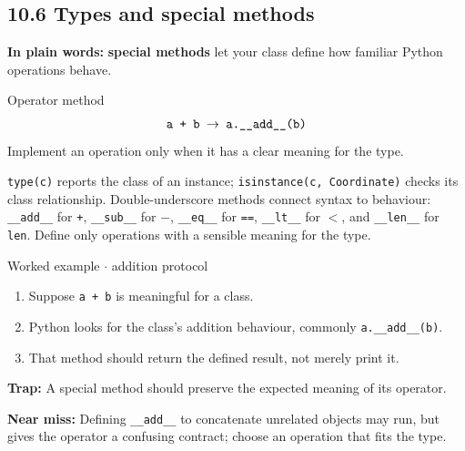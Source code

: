 \documentclass[11pt]{article}
\begin{document}
\begin{keepsection}
\section{10.6 Types and special methods}

\begin{plainbox}\textbf{In plain words:} \textbf{special methods} let your class define how familiar Python operations behave.\end{plainbox}

\begin{equationcard}{Operator method}
\[ \begin{gathered} \texttt{a + b \ensuremath{\to} a.\_\_add\_\_(b)} \end{gathered} \]
{\small Implement an operation only when it has a clear meaning for the type.}
\end{equationcard}

\texttt{type(c)} reports the class of an instance; \texttt{isinstance(c, Coordinate)} checks its class relationship. Double-underscore methods connect syntax to behaviour: \texttt{\_\_add\_\_} for \texttt{+}, \texttt{\_\_sub\_\_} for \texttt{\ensuremath{-}}, \texttt{\_\_eq\_\_} for \texttt{==}, \texttt{\_\_lt\_\_} for \texttt{\ensuremath{<}}, and \texttt{\_\_len\_\_} for \texttt{len}. Define only operations with a sensible meaning for the type.

\begin{workedbox}{Worked example \ensuremath{\cdot} addition protocol}
\begin{enumerate}
\item Suppose \texttt{a + b} is meaningful for a class.
\item Python looks for the class’s addition behaviour, commonly \texttt{a.\_\_add\_\_(b)}.
\item That method should return the defined result, not merely print it.
\end{enumerate}
\end{workedbox}

\begin{notebox}\textbf{Trap:} A special method should preserve the expected meaning of its operator.\end{notebox}

\begin{notebox}\textbf{Near miss:} Defining \texttt{\_\_add\_\_} to concatenate unrelated objects may run, but gives the operator a confusing contract; choose an operation that fits the type.\end{notebox}


\end{keepsection}
\end{document}
